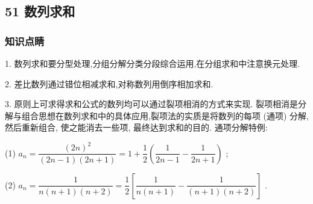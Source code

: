 \subsection*{51 数列求和}

\subsubsection*{知识点睛}

1. 数列求和要分型处理,分组分解分类分段综合运用,在分组求和中注意换元处理.

2. 差比数列通过错位相减求和,对称数列用倒序相加求和.

3. 原则上可求得求和公式的数列均可以通过裂项相消的方式来实现. 裂项相消是分解与组合思想在数列求和中的具体应用,裂项法的实质是将数列的每项 (通项) 分解,然后重新组合, 使之能消去一些项, 最终达到求和的目的. 通项分解特例:

(1) ${a}_{n} = \dfrac{{\left( 2n\right) }^{2}}{\left( {{2n} - 1}\right) \left( {{2n} + 1}\right) } = 1 + \dfrac{1}{2}\left( {\dfrac{1}{{2n} - 1} - \dfrac{1}{{2n} + 1}}\right)$ ;

(2) ${a}_{n} = \dfrac{1}{n\left( {n + 1}\right) \left( {n + 2}\right) } = \dfrac{1}{2}\left\lbrack  {\dfrac{1}{n\left( {n + 1}\right) } - \dfrac{1}{\left( {n + 1}\right) \left( {n + 2}\right) }}\right\rbrack$ .

